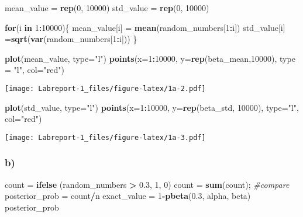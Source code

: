 \documentclass[]{article}
\newenvironment{Shaded}{\begin{snugshade}}{\end{snugshade}}
\newcommand{\CommentTok}[1]{\textcolor[rgb]{0.56,0.35,0.01}{\textit{#1}}}
\newcommand{\ControlFlowTok}[1]{\textcolor[rgb]{0.13,0.29,0.53}{\textbf{#1}}}
\newcommand{\DataTypeTok}[1]{\textcolor[rgb]{0.13,0.29,0.53}{#1}}
\newcommand{\DecValTok}[1]{\textcolor[rgb]{0.00,0.00,0.81}{#1}}
\newcommand{\FloatTok}[1]{\textcolor[rgb]{0.00,0.00,0.81}{#1}}
\newcommand{\KeywordTok}[1]{\textcolor[rgb]{0.13,0.29,0.53}{\textbf{#1}}}
\newcommand{\NormalTok}[1]{#1}
\newcommand{\OperatorTok}[1]{\textcolor[rgb]{0.81,0.36,0.00}{\textbf{#1}}}
\newcommand{\StringTok}[1]{\textcolor[rgb]{0.31,0.60,0.02}{#1}}
\begin{document}
\begin{Shaded}
\begin{Highlighting}[]
\NormalTok{mean_value =}\StringTok{ }\KeywordTok{rep}\NormalTok{(}\DecValTok{0}\NormalTok{, }\DecValTok{10000}\NormalTok{)}
\NormalTok{std_value =}\StringTok{ }\KeywordTok{rep}\NormalTok{(}\DecValTok{0}\NormalTok{, }\DecValTok{10000}\NormalTok{)}

\ControlFlowTok{for}\NormalTok{(i }\ControlFlowTok{in} \DecValTok{1}\OperatorTok{:}\DecValTok{10000}\NormalTok{)\{}
\NormalTok{  mean_value[i] =}\StringTok{ }\KeywordTok{mean}\NormalTok{(random_numbers[}\DecValTok{1}\OperatorTok{:}\NormalTok{i])}
\NormalTok{  std_value[i] =}\KeywordTok{sqrt}\NormalTok{(}\KeywordTok{var}\NormalTok{(random_numbers[}\DecValTok{1}\OperatorTok{:}\NormalTok{i]))}
\NormalTok{\}}

\KeywordTok{plot}\NormalTok{(mean_value, }\DataTypeTok{type=}\StringTok{"l"}\NormalTok{)}
\KeywordTok{points}\NormalTok{(}\DataTypeTok{x=}\DecValTok{1}\OperatorTok{:}\DecValTok{10000}\NormalTok{, }\DataTypeTok{y=}\KeywordTok{rep}\NormalTok{(beta_mean,}\DecValTok{10000}\NormalTok{), }\DataTypeTok{type =} \StringTok{"l"}\NormalTok{, }\DataTypeTok{col=}\StringTok{"red"}\NormalTok{)}
\end{Highlighting}
\end{Shaded}

\texttt{[image: Labreport-1\_files/figure-latex/1a-2.pdf]}

\begin{Shaded}
\begin{Highlighting}[]
\KeywordTok{plot}\NormalTok{(std_value, }\DataTypeTok{type=}\StringTok{"l"}\NormalTok{)}
\KeywordTok{points}\NormalTok{(}\DataTypeTok{x=}\DecValTok{1}\OperatorTok{:}\DecValTok{10000}\NormalTok{, }\DataTypeTok{y=}\KeywordTok{rep}\NormalTok{(beta_std, }\DecValTok{10000}\NormalTok{), }\DataTypeTok{type=}\StringTok{"l"}\NormalTok{, }\DataTypeTok{col=}\StringTok{"red"}\NormalTok{)}
\end{Highlighting}
\end{Shaded}

\texttt{[image: Labreport-1\_files/figure-latex/1a-3.pdf]}

\hypertarget{b}{%
\subsubsection{b)}\label{b}}

\begin{Shaded}
\begin{Highlighting}[]
\NormalTok{count =}\StringTok{ }\KeywordTok{ifelse}\NormalTok{ (random_numbers }\OperatorTok{>}\StringTok{ }\FloatTok{0.3}\NormalTok{, }\DecValTok{1}\NormalTok{, }\DecValTok{0}\NormalTok{)}
\NormalTok{count =}\StringTok{ }\KeywordTok{sum}\NormalTok{(count);}
\CommentTok{#compare}
\NormalTok{posterior_prob =}\StringTok{ }\NormalTok{count}\OperatorTok{/}\NormalTok{n}
\NormalTok{exact_value =}\StringTok{ }\DecValTok{1}\OperatorTok{-}\KeywordTok{pbeta}\NormalTok{(}\FloatTok{0.3}\NormalTok{, alpha, beta)}
\NormalTok{posterior_prob}
\end{Highlighting}
\end{Shaded}
\end{document}
